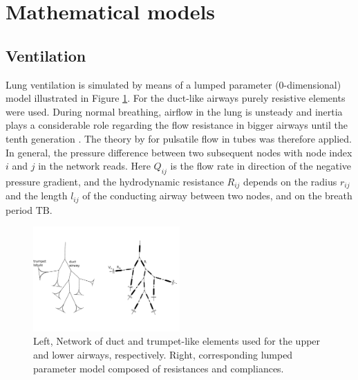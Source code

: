 \section{Mathematical models} \label{sec:mathematial_model}


\subsection{Ventilation} \label{ssec:ducts}
Lung ventilation is simulated by means of a lumped parameter (0-dimensional) model illustrated in Figure \ref{fig:lumpedparametermodel}.
For the duct-like airways purely resistive elements were used.
During normal breathing, airflow in the lung is unsteady and inertia plays a considerable role regarding the flow resistance in bigger airways until the tenth generation \citep{Kaczka2011}.
The theory by \citet{Womersley} for pulsatile flow in tubes was therefore applied.
In general, the pressure difference between two subsequent nodes with node index $i$ and $j$ in the network reads.
Here $Q_{ij}$ is the flow rate in direction of the negative pressure gradient, and the hydrodynamic resistance $R_{ij}$ depends on the radius $r_{ij}$ and the length $l_{ij}$ of the conducting airway between two nodes, and on the breath period $\mathrm{TB}$.

\begin{figure}[tb]
\centering
\includegraphics[width=0.5\textwidth]{figures/lumpedparametermodel}
\caption{Left, Network of duct and trumpet-like elements used for the upper and lower airways, respectively. Right, corresponding lumped parameter model composed of resistances and compliances.}
\label{fig:lumpedparametermodel}
\end{figure}


